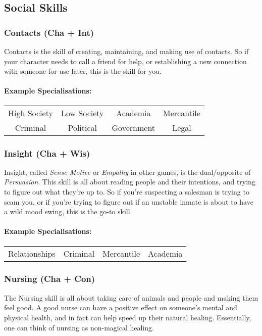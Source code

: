 \subsection{Social Skills}
\subsubsection{Contacts (Cha + Int)}
Contacts is the skill of creating, maintaining, and making use of contacts.
So if your character needs to call a friend for help, or establishing a new connection with someone for use later, this is the skill for you.

\paragraph{Example Specialisations:}
\begin{center}
    \begin{tabular}{c|c|c|c}
        High Society & Low Society & Academia & Mercantile \\
        Criminal & Political & Government & Legal \\
    \end{tabular}
\end{center}

\subsubsection{Insight (Cha + Wis)}
Insight, called \textit{Sense Motive} or \textit{Empathy} in other games, is the dual/opposite of \textit{Persuasion}. 
This skill is all about reading people and their intentions, and trying to figure out what they're up to.
So if you're suspecting a salesman is trying to scam you, or if you're trying to figure out if an unstable inmate is about to have a wild mood swing, this is the go-to skill.

\paragraph{Example Specialisations:}
\begin{center}
    \begin{tabular}{c|c|c|c}
        Relationships & Criminal & Mercantile & Academia \\
    \end{tabular}
\end{center}

\subsubsection{Nursing (Cha + Con)}
The Nursing skill is all about taking care of animals and people and making them feel good.
A good nurse can have a positive effect on someone's mental and physical health, and in fact can help speed up their natural healing.
Essentially, one can think of nursing as non-magical healing.


